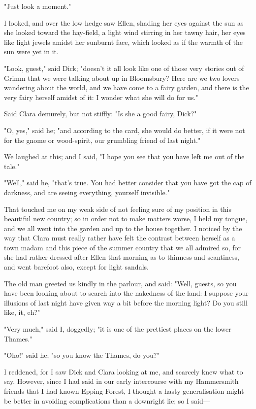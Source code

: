 "Just look a moment."

I looked, and over the low hedge saw Ellen, shading her eyes against the
sun as she looked toward the hay-field, a light wind stirring in her
tawny hair, her eyes like light jewels amidst her sunburnt face, which
looked as if the warmth of the sun were yet in it.

"Look, guest," said Dick; "doesn't it all look like one of those very
stories out of Grimm that we were talking about up in Bloomsbury? Here
are we two lovers wandering about the world, and we have come to a fairy
garden, and there is the very fairy herself amidst of it: I wonder what
she will do for us."

Said Clara demurely, but not stiffly: "Is she a good fairy, Dick?"

"O, yes," said he; "and according to the card, she would do better, if
it were not for the gnome or wood-spirit, our grumbling friend of last
night."

We laughed at this; and I said, "I hope you see that you have left me
out of the tale."

"Well," said he, "that's true. You had better consider that you have got
the cap of darkness, and are seeing everything, yourself invisible."

That touched me on my weak side of not feeling sure of my position in
this beautiful new country; so in order not to make matters worse, I
held my tongue, and we all went into the garden and up to the house
together. I noticed by the way that Clara must really rather have felt
the contrast between herself as a town madam and this piece of the
summer country that we all admired so, for she had rather dressed after
Ellen that morning as to thinness and scantiness, and went barefoot
also, except for light sandals.

The old man greeted us kindly in the parlour, and said: "Well, guests,
so you have been looking about to search into the nakedness of the land:
I suppose your illusions of last night have given way a bit before the
morning light? Do you still like, it, eh?"

"Very much," said I, doggedly; "it is one of the prettiest places on the
lower Thames."

"Oho!" said he; "so you know the Thames, do you?"

I reddened, for I saw Dick and Clara looking at me, and scarcely knew
what to say. However, since I had said in our early intercourse with my
Hammersmith friends that I had known Epping Forest, I thought a hasty
generalisation might be better in avoiding complications than a
downright lie; so I said---

